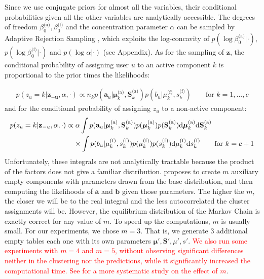 \documentclass[smallextended]{svjour3}          %
\newcommand\alberto[1]{\textcolor{red}{#1}}
\newcommand{\betaoa}{\beta_{0}^\text{(a)}}
\newcommand{\betaof}{\beta_{0}^\text{(f)}}
\newcommand{\Muk}{\boldsymbol{\mu}_{k}^\text{(a)}}
\newcommand{\Sk}{\mathbf{S}_{k}^\text{(a)}}
\newcommand{\muk}{\mu_{k}^\text{(f)}}
\newcommand{\sk}{s_{k}^\text{(f)}}
\begin{document}
Since we use conjugate priors for almost all the variables, their conditional probabilities given all the other variables are analytically accessible. The degrees of freedom $\betaoa, \betaof$ and the concentration parameter $\alpha$ can be sampled by Adaptive Rejection Sampling \citep{Gilks1992}, which exploits the log-concavity of  $p(\log \beta_0^{\text{(a)}} | \cdot)$,  $p(\log \beta_0^{\text{(f)}} | \cdot)$ and $p(\log \alpha | \cdot)$ (see Appendix). As for the sampling of $\mathbf{z}$, the conditional probability of assigning user $u$ to an active component $k$ is proportional to the prior times the likelihoods:

\begin{align}
p(z_u = k | \mathbf{z_{-u}}, \alpha, \cdot)
\propto 
n_{k}
   p(\mathbf{a}_{u} |\Muk, \Sk)    
   p({b_u} | \muk, \sk) \qquad \text{for } k=1,...,c
\end{align}
and for the conditional probability of assigning $z_u$ to a non-active component:
\begin{align}
p(z_u = k | \mathbf{z}_{-u}, \alpha, \cdot)
\propto&
\;\alpha 
   \int 
   p(\mathbf{a}_{u} |\Muk, \Sk)  p(\Muk) p(\Sk)      
   \text{d}\Muk
   \text{d}\Sk\notag\\
   &\times
   \int 
   p(b_u | \muk, \sk)
   p(\muk)p(\sk) 
   \text{d}\muk
   \text{d}\sk \qquad \text{for } k=c+1
\end{align}
Unfortunately, these integrals are not analytically tractable because the product of the factors does not give a familiar distribution. \cite{Neal2000} proposes to create $m$ auxiliary empty components with parameters drawn from the base distribution, and then computing the likelihoods of $\mathbf{a}$ and $\mathbf{b}$ given those parameters. The higher the $m$, the closer we will be to the real integral and the less autocorrelated the cluster assignments will be. However, the equilibrium distribution of the Markov Chain is exactly correct for any value of $m$. To speed up the computations, $m$ is usually small. For our experiments, we chose $m=3$. That is, we generate $3$ additional empty tables each one with its own parameters  $\boldsymbol{\mu'}, \mathbf{S'}, \mu', s'$. \alberto{We also run some experiments with $m=4$ and $m=5$, without observing significant differences neither in the clustering nor the predictions, while it significantly increased the computational time. See \cite{Neal2000} for a more systematic study on the effect of $m$}. 
\end{document}
